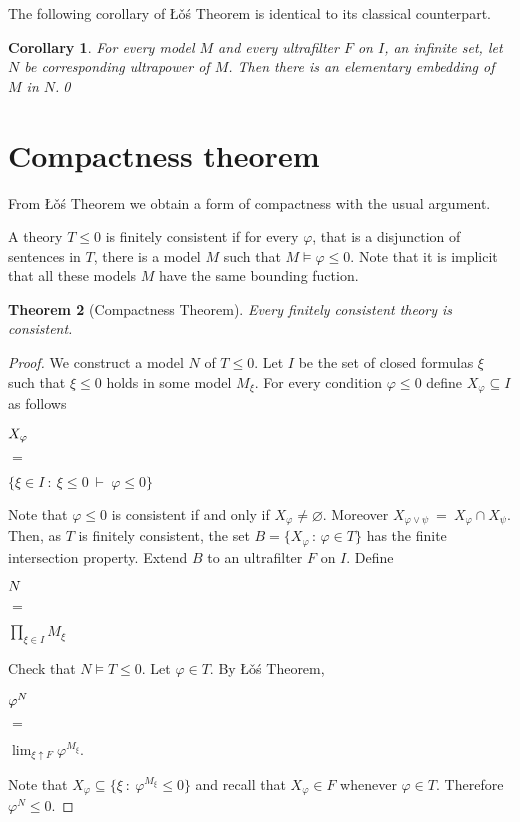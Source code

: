 \documentclass[12pt,letterpaper,oneside,reqno]{amsart}
\theoremstyle{plain}
\newtheorem{theorem}{Theorem}%
\newtheorem{corollary}[theorem]{Corollary}
\theoremstyle{remark}
\begin{document}
The following corollary of  \L\v{o}\'s Theorem is identical to its classical counterpart.

\begin{corollary}
  For every model $M$ and every ultrafilter $F$ on $I$, an infinite set, let $N$ be corresponding ultrapower of $M$.
  Then there is an elementary embedding of $M$ in $N$.\qed
\end{corollary}

\section{Compactness theorem}\label{compactness}

\def\ceq#1#2#3{\parbox[t]{20ex}{$\displaystyle #1$}\parbox{5ex}{\hfil $#2$}{$\displaystyle #3$}}

From \L\v{o}\'s Theorem we obtain a form of compactness with the usual argument.

A theory $T\le0$ is finitely consistent if for every $\varphi$, that is a disjunction of sentences in $T$, there is a model $M$ such that $M\models \varphi\le0$.
Note that it is implicit that all these models $M$ have the same bounding fuction.

\begin{theorem}[Compactness Theorem]\label{thm_compattezza}
  Every finitely consistent theory is consistent. 
  \end{theorem}
  
  \begin{proof}
  We construct a model $N$ of $T\le0$.
  Let $I$ be the set of closed formulas $\xi$ such that $\xi\le0$ holds in some model $M_\xi$.
  For every condition $\varphi\le0$ define $X_\varphi\subseteq I$ as follows
  
  \ceq{\hfill X_\varphi}{=}{\Big\{\xi\in I\ :\ \xi\le0\ \vdash\ \varphi\le0\Big\}}
  
  Note that $\varphi\le0$ is consistent if and only if $X_\varphi\neq\varnothing$.
  Moreover $X_{\varphi\vee\psi}\ =\ X_\varphi\cap X_\psi$. Then, as $T$  is finitely consistent, the set $B=\big\{X_\varphi\,:\,\varphi\in T\big\}$ has the finite intersection property.
  Extend $B$ to an ultrafilter $F$ on $I$.
  Define
  
  \ceq{\hfill N}{=}{\prod_{\xi\in I}M_\xi}
  
  Check that $N\models T\le0$. Let $\varphi\in T$. By \L\v{o}\'s Theorem,
  
  \ceq{\hfill \varphi^N}%
  {=}%
  {\lim_{\xi\uparrow F}\varphi^{M_\xi}.}
  
  Note that $X_\varphi\subseteq \big\{\xi\ :\ \varphi^{M_\xi}\le0\big\}$ and recall that $X_\varphi\in F$ whenever $\varphi\in T$.
  Therefore $\varphi^N\le0$.
  \end{proof}
\end{document}
